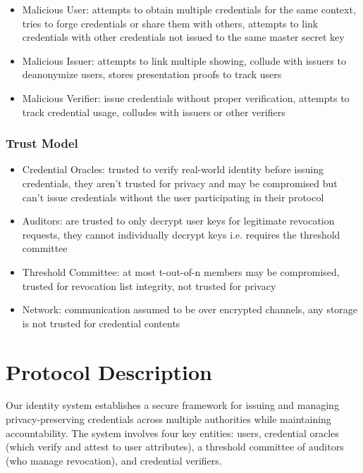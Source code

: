 \begin{itemize}
    \item Malicious User: attempts to obtain multiple credentials for the same context, tries to forge credentials or share them with others, attempts to link credentials with other credentials not issued to the same master secret key
    \item Malicious Issuer: attempts to link multiple showing, collude with issuers to deanonymize users, stores presentation proofs to track users
    \item Malicious Verifier: issue credentials without proper verification, attempts to track credential usage, colludes with issuers or other verifiers
\end{itemize}

\subsubsection{Trust Model}
\begin{itemize}
    \item Credential Oracles: trusted to verify real-world identity before issuing credentials, they aren't trusted for privacy and may be compromised but can't issue credentials without the user participating in their protocol

    \item Auditors: are trusted to only decrypt user keys for legitimate revocation requests, they cannot individually decrypt keys i.e. requires the threshold committee

    \item Threshold Committee: at most t-out-of-n members may be compromised, trusted for revocation list integrity, not trusted for privacy

    \item Network: communication assumed to be over encrypted channels, any storage is not trusted for credential contents
\end{itemize}






\newpage
\section{Protocol Description}
Our identity system establishes a secure framework for issuing and managing privacy-preserving credentials across multiple authorities while maintaining accountability. The system involves four key entities: users, credential oracles (which verify and attest to user attributes), a threshold committee of auditors (who manage revocation), and credential verifiers.


